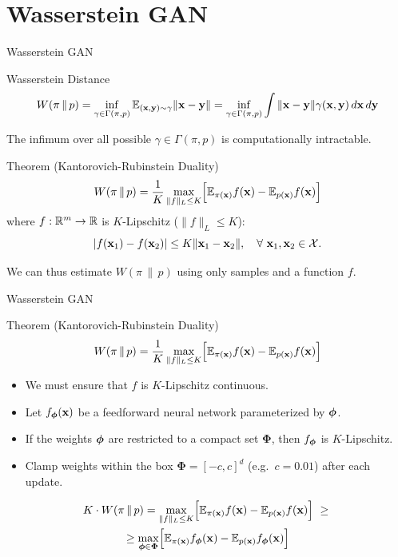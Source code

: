 \documentclass{beamer}
\begin{document}
\section{Wasserstein GAN}
\begin{frame}{Wasserstein GAN}
	\begin{block}{Wasserstein Distance}
		\vspace{-0.5cm}
		\[
		W(\pi\,\|\,p) = \inf_{\gamma \in \Gamma(\pi, p)} \mathbb{E}_{(\mathbf{x}, \mathbf{y}) \sim \gamma} \| \mathbf{x} - \mathbf{y} \| =  \inf_{\gamma \in \Gamma(\pi, p)} \int \|\mathbf{x} - \mathbf{y}\| \gamma (\mathbf{x}, \mathbf{y})\, d\mathbf{x}\, d\mathbf{y}
		\]
		\vspace{-0.3cm}
	\end{block}
	\eqpause
	The infimum over all possible $\gamma \in \Gamma(\pi, p)$ is computationally intractable.
	\eqpause
	\begin{block}{Theorem (Kantorovich-Rubinstein Duality)}
		\vspace{-0.3cm}
		\[
			W(\pi\,\|\,p) = \frac{1}{K} \max_{\| f \|_L \leq K} \Bigl[ \mathbb{E}_{\pi(\mathbf{x})} f(\mathbf{x})  - \mathbb{E}_{p(\mathbf{x})} f(\mathbf{x})\Bigr]
		\]
		where $f : \mathbb{R}^m \rightarrow \mathbb{R}$ is $K$-Lipschitz ($\|f\|_L \leq K$):
		\[
			|f(\mathbf{x}_1) - f(\mathbf{x}_2)| \leq K \|\mathbf{x}_1 - \mathbf{x}_2\|,\quad \forall\ \mathbf{x}_1, \mathbf{x}_2 \in \mathcal{X}.
		\]
		\vspace{-0.6cm}
	\end{block}
	\eqpause
	We can thus estimate $W(\pi\,\|\,p)$ using only samples and a function $f$.
\end{frame}
\begin{frame}{Wasserstein GAN}
	\begin{block}{Theorem (Kantorovich-Rubinstein Duality)}
		\[
		W(\pi\,\|\,p) = \frac{1}{K} \max_{\| f \|_L \leq K} \Bigl[ \mathbb{E}_{\pi(\mathbf{x})} f(\mathbf{x})  - \mathbb{E}_{p(\mathbf{x})} f(\mathbf{x})\Bigr]
		\]
	\end{block}
	\begin{itemize}
		\item We must ensure that $f$ is $K$-Lipschitz continuous.
		\item Let $f_{\boldsymbol{\phi}}(\mathbf{x})$ be a feedforward neural network parameterized by $\boldsymbol{\phi}$.
		\item If the weights $\boldsymbol{\phi}$ are restricted to a compact set $\boldsymbol{\Phi}$, then $f_{\boldsymbol{\phi}}$ is $K$-Lipschitz.
		\eqpause
		\item Clamp weights within the box $\boldsymbol{\Phi} = [-c, c]^d$ (e.g.\ $c = 0.01$) after each update.
	\end{itemize}
	\begin{multline*}
		K \cdot W(\pi\,\|\,p) = \max_{\| f \|_L \leq K} \Bigl[ \mathbb{E}_{\pi(\mathbf{x})} f(\mathbf{x})  - \mathbb{E}_{p(\mathbf{x})} f(\mathbf{x})\Bigr]\ \geq\ \\  \geq \max_{\boldsymbol{\phi} \in \boldsymbol{\Phi}} \Bigl[ \mathbb{E}_{\pi(\mathbf{x})} f_{\boldsymbol{\phi}}(\mathbf{x})  - \mathbb{E}_{p(\mathbf{x})} f_{\boldsymbol{\phi}}(\mathbf{x})\Bigr]
	\end{multline*}
\end{frame}
\end{document}
